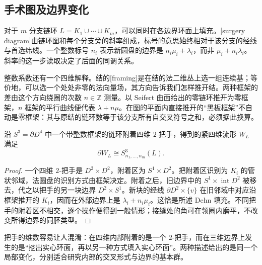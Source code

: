 \subsection{手术图及边界变化}
\label{g2:subsec:A03:02}

对于 \(m\) 分支链环 \(L=K_1\cup\cdots\cup K_m\)，可以同时在各边界环面上填充。[surgery diagram]由链环图和每个分支旁的斜率组成，标号的意思始终相对于该分支的经线与首选纬线。一个整数标号 \(n_i\) 表示新圆盘的边界是 \(n_i\mu_i+\lambda_i\)，而非 \(\mu_i+n_i\lambda_i\)。斜率的这一步读取决定了后面的同调关系。

\ProseParagraphBreak

整数系数还有一个四维解释。结的[framing]是在结的法二维丛上选一组连续基；等价地，可以选一个处处非零的法向量场，其方向告诉我们怎样推开结。两种框架的差由这个方向绕圈的次数 \(n\in\mathbb Z\) 测量。以 Seifert 曲面给出的零链环推开为零框架，\(n\) 框架的平行曲线便代表 \(\lambda+n\mu\)。在图的平面内直接推开的“黑板框架”不自动是零框架：其与原结的链环数等于该分支所有自交叉符号之和，必须据此换算。

\begin{proposition}\label{g2:prop:framed-surgery-trace}
	沿 \(S^3=\partial D^4\) 中一个带整数框架的链环附着四维 \(2\)-把手，得到的紧四维流形 \(W_L\) 满足
	\[
		\partial W_L\cong S^3_{n_1,\ldots,n_m}(L).
	\]
\end{proposition}
\begin{proof}
	一个四维 \(2\)-把手是 \(D^2\times D^2\)，附着区为 \(S^1\times D^2\)。把附着区识别为 \(K_i\) 的管状邻域，法圆盘的识别方式由框架决定。附着之后，旧边界中的 \(S^1\times\operatorname{int}D^2\) 被移去，代之以把手的另一块边界 \(D^2\times S^1\)。新块的经线 \(\partial D^2\times\{v\}\) 在旧邻域中对应沿框架推开的 \(K_i\)，因而在外部边界上是 \(\lambda_i+n_i\mu_i\)。这恰是所述 Dehn 填充。不同把手的附着区不相交，逐个操作便得到一般情形；接缝处的角可在领圈内磨平，不改变所得边界的同胚类型。
\end{proof}

把手的维数容易让人混淆：在四维内部附着的是一个 \(2\)-把手，而在三维边界上发生的是“挖出实心环面，再以另一种方式填入实心环面”。两种描述给出的是同一个局部变化，分别适合研究内部的交叉形式与边界的基本群。

